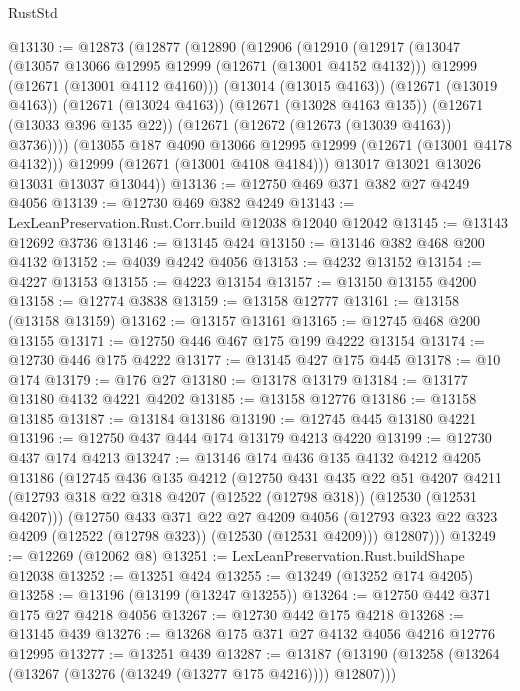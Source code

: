 \begin{lexlean}{RustStd}
\begin{coremodule}
@13130 := @12873
    (@12877
      (@12890
        (@12906
          (@12910
            (@12917
              (@13047
                (@13057 @13066 @12995 @12999 (@12671 (@13001 @4152 @4132)))
                @12999
                (@12671 (@13001 @4112 @4160)))
              (@13014 (@13015 @4163))
              (@12671 (@13019 @4163))
              (@12671 (@13024 @4163))
              (@12671 (@13028 @4163 @135))
              (@12671 (@13033 @396 @135 @22))
              (@12671 (@12672 (@12673 (@13039 @4163)) @3736))))
          (@13055 @187 @4090 @13066 @12995 @12999 (@12671 (@13001 @4178 @4132)))
          @12999
          (@12671 (@13001 @4108 @4184)))
        @13017
        @13021
        @13026
        @13031
        @13037
        @13044))
@13136 := @12750 @469 @371 @382 @27 @4249 @4056
@13139 := @12730 @469 @382 @4249
@13143 := LexLeanPreservation.Rust.Corr.build @12038 @12040 @12042
@13145 := @13143 @12692 @3736
@13146 := @13145 @424
@13150 := @13146 @382 @468 @200 @4132
@13152 := @4039 @4242 @4056
@13153 := @4232 @13152
@13154 := @4227 @13153
@13155 := @4223 @13154
@13157 := @13150 @13155 @4200
@13158 := @12774 @3838
@13159 := @13158 @12777
@13161 := @13158 (@13158 @13159)
@13162 := @13157 @13161
@13165 := @12745 @468 @200 @13155
@13171 := @12750 @446 @467 @175 @199 @4222 @13154
@13174 := @12730 @446 @175 @4222
@13177 := @13145 @427 @175 @445
@13178 := @10 @174
@13179 := @176 @27
@13180 := @13178 @13179
@13184 := @13177 @13180 @4132 @4221 @4202
@13185 := @13158 @12776
@13186 := @13158 @13185
@13187 := @13184 @13186
@13190 := @12745 @445 @13180 @4221
@13196 := @12750 @437 @444 @174 @13179 @4213 @4220
@13199 := @12730 @437 @174 @4213
@13247 := @13146
    @174
    @436
    @135
    @4132
    @4212
    @4205
    @13186
    (@12745
      @436
      @135
      @4212
      (@12750
        @431
        @435
        @22
        @51
        @4207
        @4211
        (@12793 @318 @22 @318 @4207 (@12522 (@12798 @318)) (@12530 (@12531 @4207)))
        (@12750
          @433
          @371
          @22
          @27
          @4209
          @4056
          (@12793 @323 @22 @323 @4209 (@12522 (@12798 @323)) (@12530 (@12531 @4209)))
          @12807)))
@13249 := @12269 (@12062 @8)
@13251 := LexLeanPreservation.Rust.buildShape @12038
@13252 := @13251 @424
@13255 := @13249 (@13252 @174 @4205)
@13258 := @13196 (@13199 (@13247 @13255))
@13264 := @12750 @442 @371 @175 @27 @4218 @4056
@13267 := @12730 @442 @175 @4218
@13268 := @13145 @439
@13276 := @13268 @175 @371 @27 @4132 @4056 @4216 @12776 @12995
@13277 := @13251 @439
@13287 := @13187 (@13190 (@13258 (@13264 (@13267 (@13276 (@13249 (@13277 @175 @4216)))) @12807)))

\end{coremodule}
\end{lexlean}
